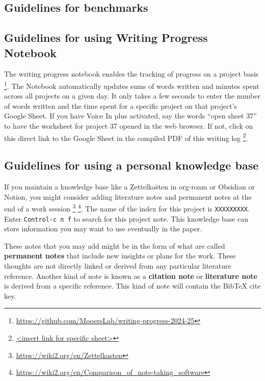\documentclass[10pt,letterpaper]{article}
\begin{document}
\subsection{Guidelines for benchmarks}
\label{subsec:guides:benchmarks}


\subsection{Guidelines for using Writing Progress Notebook}
\label{subsec:guides:wpnb}

The writing progress notebook enables the tracking of progress on a project basis \footnote{\url{https://github.com/MooersLab/writing-progress-2024-25}}.
The Notebook automatically updates sums of words written and minutes spent across all projects on a given day.
It only takes a few seconds to enter the number of words written and the time spent for a specific project on that project's Google Sheet. 
If you have Voice In plus activated, say the words ``open sheet 37'' to have the worksheet for project 37 opened in the web browser.
If not, click on this direct link to the Google Sheet in the compiled PDF of this writing log \footnote{\url{<insert link for specific sheet>}}.




\subsection{Guidelines for using a personal knowledge base}
\label{subsec:guides:knowledgebase}

If you maintain a knowledge base like a Zettelka\"sten  in org-roam or Obsidian or Notion, you might consider adding literature notes and permanent notes at the end of a work session \footnote{\url{https://wiki2.org/en/Zettelkasten}} \footnote{\url{https://wiki2.org/en/Comparison_of_note-taking_software}}.
The name of the index for this project is \verb|XXXXXXXXX|.
Enter \texttt{Control-c n f} to search for this project note.
This knowledge base can store information you may want to use eventually in the paper.

These notes that you may add might be in the form of what are called \textbf{permanent notes} that include new insights or plans for the work.
These thoughts are not directly linked or derived from any particular literature reference.
Another kind of note is known as a \textbf{citation note} or \textbf{literature note} is derived from a specific reference.
This kind of note will contain the BibTeX cite key.
\end{document}
